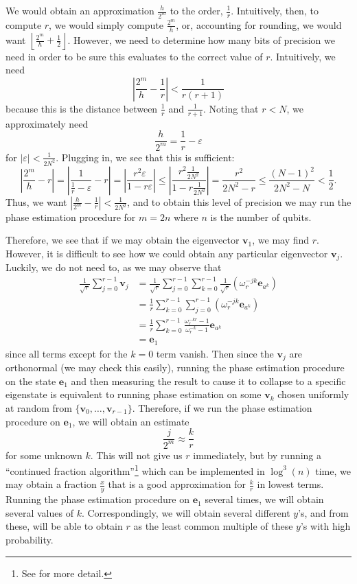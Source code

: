 \documentclass[a4paper]{article}
\newcommand\0{\mathbf{0}}
\newcommand\ee{\mathbf{e}}
\newcommand\vv{\mathbf{v}}
\newcommand\<{\langle}
\renewcommand\>{\rangle}
\begin{document}
We would obtain an approximation $\frac{h}{2^m}$ to the order, $\frac{1}{r}$. Intuitively, then, to compute $r$, we would simply compute $\frac{2^m}{h}$, or, accounting for rounding, we would want $\left\lfloor\frac{2^m}{h}+\frac{1}{2}\right\rfloor$. However, we need to determine how many bits of precision we need in order to be sure this evaluates to the correct value of $r$. Intuitively, we need $$\left| \frac{2^m}{h} - \frac{1}{r} \right| < \frac{1}{r(r+1)}$$ because this is the distance between $\frac{1}{r}$ and $\frac{1}{r+1}$. Noting that $r<N$, we approximately need $$\frac{h}{2^m} = \frac{1}{r}-\varepsilon$$ for $|\varepsilon| < \frac{1}{2N^2}$. Plugging in, we see that this is sufficient:
$$\left| \frac{2^m}{h} - r \right|  = \left| \frac{1}{\frac{1}{r}-\varepsilon} - r \right| = \left| \frac{r^2\varepsilon}{1-r\varepsilon} \right| \le \left| \frac{r^2\frac{1}{2N^2}}{1-r\frac{1}{2N^2}} \right| = \frac{r^2}{2N^2-r} \le \frac{(N-1)^2}{2N^2-N} < \frac{1}{2}.$$
Thus, we want $\left|\frac{h}{2^m}-\frac{1}{r}\right| < \frac{1}{2N^2}$, and to obtain this level of precision we may run the phase estimation procedure for $m=2n$ where $n$ is the number of qubits.

Therefore, we see that if we may obtain the eigenvector $\vv_1$, we may find $r$. However, it is difficult to see how we could obtain any particular eigenvector $\vv_j$. Luckily, we do not need to, as we may observe that 
\begin{align*}
\frac{1}{\sqrt{r}} \sum_{j=0}^{r-1} \vv_j &= \frac{1}{\sqrt{r}} \sum_{j=0}^{r-1} \sum_{k=0}^{r-1} \frac{1}{\sqrt{r}}\left(\omega_r^{-jk}\ee_{a^k}\right) \\
&= \frac{1}{r} \sum_{k=0}^{r-1} \sum_{j=0}^{r-1} \left(\omega_r^{-jk}\ee_{a^k}\right) \\
&= \frac{1}{r} \sum_{k=0}^{r-1} \frac{\omega_r^{-kr}-1}{\omega_r^{-k}-1} \ee_{a^k} \\ 
&= \ee_1
\end{align*}
since all terms except for the $k=0$ term vanish. Then since the $\vv_j$ are orthonormal (we may check this easily), running the phase estimation procedure on the state $\ee_1$ and then measuring the result to cause it to collapse to a specific eigenstate is equivalent to running phase estimation on some $\vv_k$ chosen uniformly at random from $\{\vv_0,\ldots,\vv_{r-1}\}$. Therefore, if we run the phase estimation procedure on $\ee_1$, we will obtain an estimate $$\frac{j}{2^m}\approx \frac{k}{r}$$ for some unknown $k$. This will not give us $r$ immediately, but by running a ``continued fraction algorithm''\footnote{See \cite{bacon06} for more detail.} which can be implemented in $\log^3(n)$ time, we may obtain a fraction $\frac{x}{y}$ that is a good approximation for $\frac{k}{r}$ in lowest terms. Running the phase estimation procedure on $\ee_1$ several times, we will obtain several values of $k$. Correspondingly, we will obtain several different $y$'s, and from these, will be able to obtain $r$ as the least common multiple of these $y$'s with high probability. 
\end{document}

